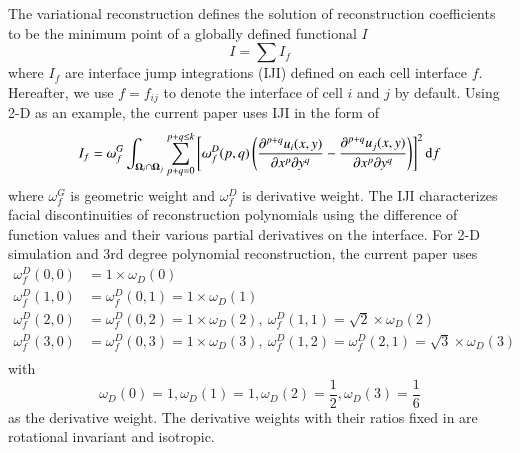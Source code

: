 \documentclass[preprint,12pt]{elsarticle}
\begin{document}
The variational reconstruction defines the solution of reconstruction coefficients
to be the minimum point of a globally defined functional $I$
\begin{equation}
    I = \sum{I_f}
\end{equation}
where $I_f$ are interface jump integrations (IJI) defined on each cell interface $f$.
Hereafter, we use $f=f_{ij}$ to denote the interface of cell $i$ and $j$ by default.
Using 2-D as an example, the current paper uses IJI in the form of
\begin{equation}
    I_f = \omega_f^G\int_{\OO_i \cap \OO_j}{
        \sum_{p+q=0}^{p + q\leq k}\left[
            \omega_f^D(p,q)
            \left(
            \partialderivative{^{p+q}u_i(x,y)}{x^p\partial y^q}
            -
            \partialderivative{^{p+q}u_j(x,y)}{x^p\partial y^q}
            \right)
            \right]^2
        \dd f
    }
\end{equation}
where $\omega_f^G$ is geometric weight and
$\omega_f^D$ is derivative weight.
The IJI characterizes facial discontinuities of reconstruction polynomials using
the difference of
function values and their various partial derivatives on the interface.
For 2-D simulation and 3rd degree polynomial reconstruction, the current paper uses
\begin{equation}
    \begin{aligned}
        \omega_f^D(0,0) & = 1\times \omega_D(0)                                                                                    \\
        \omega_f^D(1,0) & = \omega_f^D(0,1) = 1\times \omega_D(1)                                                                  \\
        \omega_f^D(2,0) & = \omega_f^D(0,2) = 1\times \omega_D(2),\ \omega_f^D(1,1) = \sqrt{2}\times \omega_D(2)                   \\
        \omega_f^D(3,0) & = \omega_f^D(0,3) = 1\times \omega_D(3),\ \omega_f^D(1,2) = \omega_f^D(2,1) = \sqrt{3}\times \omega_D(3) \\
    \end{aligned}
    \label{eq:wdRotRatio}
\end{equation}
with
\begin{equation}
    \omega_D(0) = 1, \omega_D(1) = 1, \omega_D(2) = \frac{1}{2}, \omega_D(3) = \frac{1}{6}
    \label{eq:wdHQMOPT}
\end{equation}
as the derivative weight.
The derivative weights with their ratios fixed
in  are rotational invariant and
isotropic.
\end{document}
